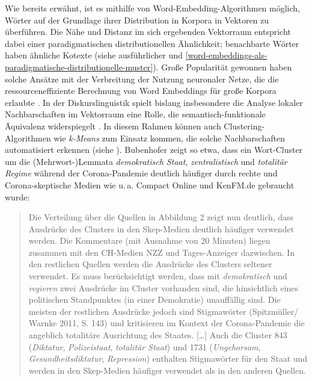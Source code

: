Wie bereits erwähnt, ist es mithilfe von Word-Embedding-Algorithmen möglich, Wörter auf der Grundlage ihrer Distribution in Korpora in Vektoren zu überführen. Die Nähe und Distanz im sich ergebenden Vektorraum entspricht dabei einer paradigmatischen distributionellen Ähnlichkeit; benachbarte Wörter haben ähnliche Kotexte (siehe ausführlicher  und \ref{word-embeddings-als-paradigmatische-distributionelle-muster}). Große Popularität gewonnen haben solche Ansätze mit der Verbreitung der Nutzung neuronaler Netze, die die ressourceneffiziente Berechnung von Word Embeddings für große Korpora erlaubte \autocite{mikolovEfficientEstimationWord2013}. In der Diskurslinguistik spielt bislang insbesondere die Analyse lokaler Nachbarschaften im Vektorraum eine Rolle, die semantisch-funktionale Äquivalenz widerspiegelt \autocite{bubenhoferSemantischeAquivalenzGeburtserzahlungen2020}. In diesem Rahmen können auch Clustering-Algorithmen wie \emph{k-Means} \autocite{macqueenMethodsClassificationAnalysis1967} zum Einsatz kommen, die solche Nachbarschaften automatisiert erkennen (siehe ). Bubenhofer zeigt so etwa, dass ein Wort-Cluster um die (Mehrwort\mbox{-})Lemmata \emph{demokratisch Staat}, \emph{zentralistisch} und \emph{totalitär Regime} während der Corona-Pandemie deutlich häufiger durch rechte und Corona-skeptische Medien wie u.\,a. Compact Online und KenFM.de gebraucht wurde:

\begin{quote}
Die Verteilung über die Quellen in Abbildung 2 zeigt nun deutlich, dass Ausdrücke des Clusters in den Skep-Medien deutlich häufiger verwendet werden. Die Kommentare (mit Ausnahme von 20 Minuten) liegen zusammen mit den CH-Medien NZZ und Tages-Anzeiger dazwischen. In den restlichen Quellen werden die Ausdrücke des Clusters seltener verwendet. Es muss berücksichtigt werden, dass mit \emph{demokratisch} und \emph{regieren} zwei Ausdrücke im Cluster vorhanden sind, die hinsichtlich eines politischen Standpunktes (in einer Demokratie) unauffällig sind. Die meisten der restlichen Ausdrücke jedoch sind Stigmawörter (Spitzmüller/ Warnke 2011, S. 143) und kritisieren im Kontext der Corona-Pandemie die angeblich totalitäre Ausrichtung des Staates. {[}\ldots{]} Auch die Cluster 843 (\emph{Diktatur}, \emph{Polizeistaat}, \emph{totalitär Staat}) und 1731 (\emph{Ungehorsam}, \emph{Gesundheitsdiktatur}, \emph{Repression}) enthalten Stigmawörter für den Staat und werden in den Skep-Medien häufiger verwendet als in den anderen Quellen. \autocite[205-206]{bubenhoferExplorationSemantischerRaeume2022}
\end{quote}

